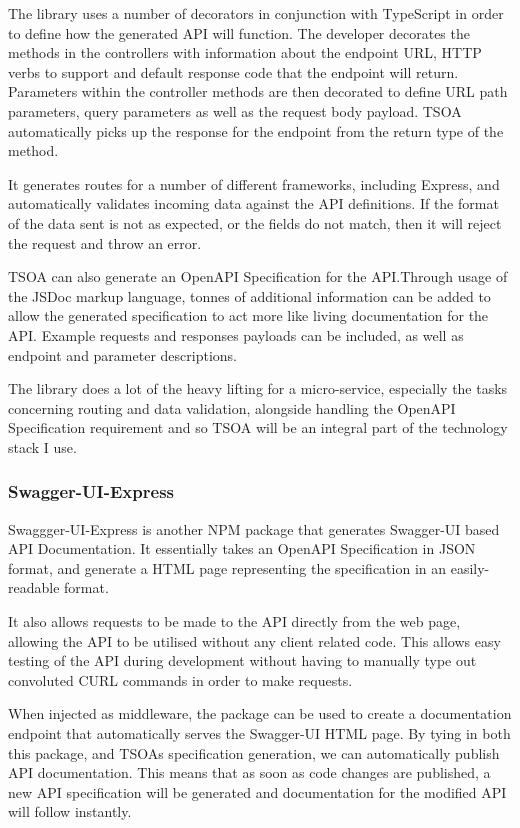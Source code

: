 The library uses a number of decorators in conjunction with TypeScript in order to define how the generated API will function. The developer decorates the methods in the controllers with information about the endpoint URL, HTTP verbs to support and default response code that the endpoint will return. Parameters within the controller methods are then decorated to define URL path parameters, query parameters as well as the request body payload. TSOA automatically picks up the response for the endpoint from the return type of the method. 

It generates routes for a number of different frameworks, including Express, and automatically validates incoming data against the API definitions. If the format of the data sent is not as expected, or the fields do not match, then it will reject the request and throw an error.

TSOA can also generate an OpenAPI Specification for the API.Through usage of the JSDoc markup language, tonnes of additional information can be added to allow the generated specification to act more like living documentation for the API. Example requests and responses payloads can be included, as well as endpoint and parameter descriptions.

The library does a lot of the heavy lifting for a micro-service, especially the tasks concerning routing and data validation, alongside handling the OpenAPI Specification requirement and so TSOA will be an integral part of the technology stack I use.
\subsubsection{Swagger-UI-Express}
Swaggger-UI-Express is another NPM package that generates Swagger-UI based API Documentation. It essentially takes an OpenAPI Specification in JSON format, and generate a HTML page representing the specification in an easily-readable format.

It also allows requests to be made to the API directly from the web page, allowing the API to be utilised without any client related code. This allows easy testing of the API during development without having to manually type out convoluted CURL commands in order to make requests.

When injected as middleware, the package can be used to create a documentation endpoint that automatically serves the Swagger-UI HTML page. By tying in both this package, and TSOAs specification generation, we can automatically publish API documentation. This means that as soon as code changes are published, a new API specification will be generated  and documentation for the modified API will follow instantly.
